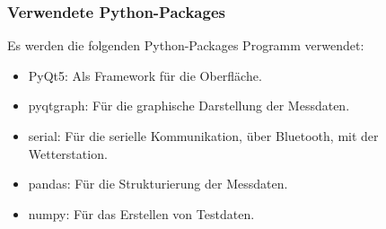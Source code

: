 \subsubsection*{Verwendete Python-Packages}
Es werden die folgenden Python-Packages Programm verwendet:
\begin{itemize}
\item PyQt5: Als Framework für die Oberfläche.
\item pyqtgraph: Für die graphische Darstellung der Messdaten.
\item serial: Für die serielle Kommunikation, über Bluetooth, mit der Wetterstation.
\item pandas: Für die Strukturierung der Messdaten.
\item numpy: Für das Erstellen von Testdaten.
\end{itemize}

